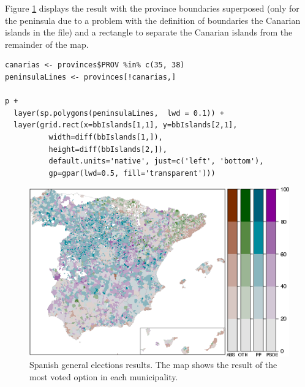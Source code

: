 Figure \ref{fig:mapLegends} displays the result with the province boundaries
superposed (only for the peninsula due to a problem with the
definition of boundaries the Canarian islands in the file) and a
rectangle to separate the Canarian islands from the remainder of the
map.

\lstset{language=R,numbers=none}
\begin{lstlisting}
canarias <- provinces$PROV %in% c(35, 38)
peninsulaLines <- provinces[!canarias,]

p +
  layer(sp.polygons(peninsulaLines,  lwd = 0.1)) +
  layer(grid.rect(x=bbIslands[1,1], y=bbIslands[2,1],
		  width=diff(bbIslands[1,]),
		  height=diff(bbIslands[2,]),
		  default.units='native', just=c('left', 'bottom'),
		  gp=gpar(lwd=0.5, fill='transparent')))
\end{lstlisting}

\begin{figure}[htb]
\centering
\includegraphics[width=.9\linewidth]{figs/mapLegends.png}
\caption{\label{fig:mapLegends}Spanish general elections results. The map shows the result of the most voted option in each municipality.}
\end{figure}
